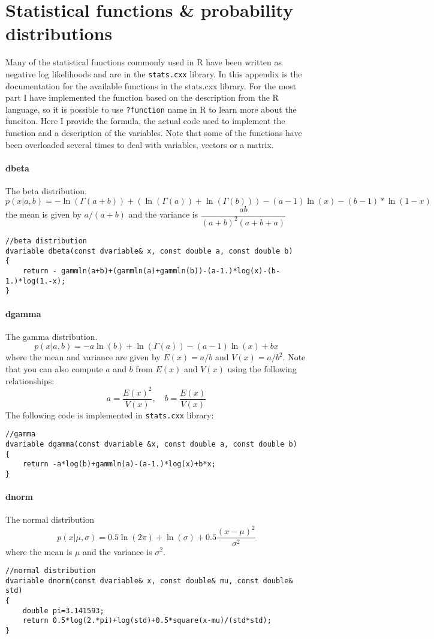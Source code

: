 \section{Statistical functions \& probability distributions}
\begin{multicols}{2}
Many of the statistical functions commonly used in R have been written as negative log likelihoods and are in the \texttt{stats.cxx} library.  In this appendix is the documentation for the available functions in the stats.cxx library.  For the most part I have implemented the function based on the description from the R language, so it is possible to use \texttt{?function} name in R to learn more about the funciton.  Here I provide the formula, the actual code used to implement the function and a description of the variables. Note that some of the functions have been overloaded several times to deal with variables, vectors or a matrix.
\end{multicols}

\paragraph{dbeta} The beta distribution.
\[
	p(x|a,b) = - \ln(\Gamma(a+b))+(\ln(\Gamma(a))+\ln(\Gamma(b)))-(a-1)\ln(x)-(b-1)*\ln(1-x)
\]
the mean is given by $a/(a+b)$ and the variance is $\dfrac{ab}{(a+b)^2(a+b+a)}$
\begin{verbatim}
//beta distribution
dvariable dbeta(const dvariable& x, const double a, const double b)
{
	return - gammln(a+b)+(gammln(a)+gammln(b))-(a-1.)*log(x)-(b-1.)*log(1.-x);
}
\end{verbatim}

\paragraph{dgamma} The gamma distribution.
\[
 p(x|a,b) = -a \ln(b)+\ln(\Gamma(a))-(a-1)\ln(x)+bx
\]
where the mean and variance are given by $E(x) = a/b$ and $V(x) = a/b^2$.   Note that you can also compute $a$ and $b$ from $E(x)$ and $V(x)$ using the following relationships:
\[
 a=\frac{E(x)^2}{V(x)}, \quad b=\frac{E(x)}{V(x)}
\]
\noindent The following code is implemented in \texttt{stats.cxx} library:
\begin{verbatim}
//gamma
dvariable dgamma(const dvariable &x, const double a, const double b)
{
	return -a*log(b)+gammln(a)-(a-1.)*log(x)+b*x;
}
\end{verbatim}


\paragraph{dnorm} The normal distribution
\[
	p(x|\mu,\sigma) = 0.5\ln(2\pi)+\ln(\sigma)+0.5\frac{(x-\mu)^2}{\sigma^2}
\]
where the mean is $\mu$ and the variance is $\sigma^2$.
\begin{verbatim}
//normal distribution
dvariable dnorm(const dvariable& x, const double& mu, const double& std)
{
	double pi=3.141593;
	return 0.5*log(2.*pi)+log(std)+0.5*square(x-mu)/(std*std);
}
\end{verbatim}

